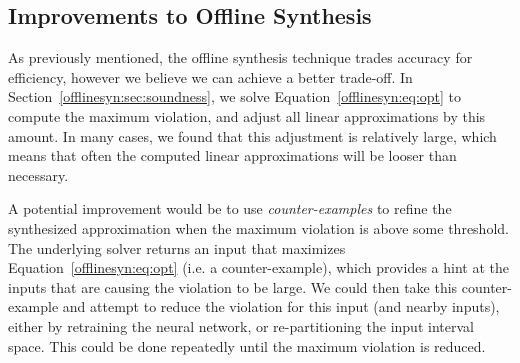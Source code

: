 \subsection{Improvements to Offline Synthesis}
As previously mentioned, the offline synthesis technique trades accuracy
for efficiency, however we believe we can achieve a better trade-off. In
Section~\ref{offlinesyn:sec:soundness}, we solve
Equation~\ref{offlinesyn:eq:opt} to compute the maximum violation, and
adjust all linear approximations by this amount. In many cases, we found
that this adjustment is relatively large, which means that often the
computed linear approximations will be looser than necessary.

A potential improvement would be to use \textit{counter-examples} to refine
the synthesized approximation when the maximum violation is above some
threshold. The underlying solver returns an input that maximizes
Equation~\ref{offlinesyn:eq:opt} (i.e. a counter-example), which provides a
hint at the inputs that are causing the violation to be large. We could
then take this counter-example and attempt to reduce the violation for this
input (and nearby inputs), either by retraining the neural network, or
re-partitioning the input interval space. This could be done repeatedly
until the maximum violation is reduced.